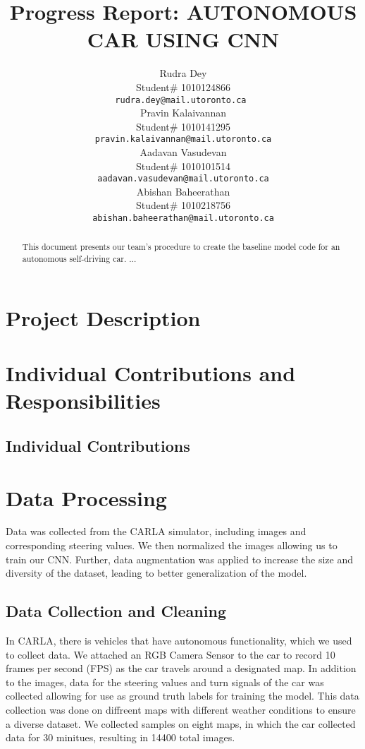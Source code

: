 \documentclass{article} %
\title{Progress Report: AUTONOMOUS CAR USING CNN\\}
\author{Rudra Dey  \\
Student\# 1010124866\\
\texttt{rudra.dey@mail.utoronto.ca } \\
\And
Pravin Kalaivannan  \\
Student\# 1010141295 \\
\texttt{pravin.kalaivannan@mail.utoronto.ca} \\
\AND
Aadavan Vasudevan  \\
Student\# 1010101514 \\
\texttt{aadavan.vasudevan@mail.utoronto.ca} \\
\And
Abishan Baheerathan \\
Student\# 1010218756 \\
\texttt{abishan.baheerathan@mail.utoronto.ca} \\
\AND
}
\begin{document}
\maketitle

\begin{abstract}
This document presents our team's procedure to create the baseline model
code for an autonomous self-driving car. ...\\

\end{abstract}

\section{Project Description}

\section{Individual Contributions and Responsibilities}

\subsection{Individual Contributions}

\section{Data Processing}

Data was collected from the CARLA simulator, including images and corresponding steering values. We then normalized the images allowing us to train our CNN.
Further, data augmentation was applied to increase the size and diversity of the dataset, leading to better generalization of the model.


\subsection{Data Collection and Cleaning}

In CARLA, there is vehicles that have autonomous functionality, which we used to collect data.
We attached an RGB Camera Sensor to the car to record 10 frames per second (FPS) as the car
travels around a designated map. In addition to the images, data for the steering values and turn signals of the car
was collected allowing for use as ground truth labels for training the model. This data collection was done on diffreent maps with different weather conditions
to ensure a diverse dataset. We collected samples on eight maps, in which the car collected data for 30 minitues, resulting in 14400 total images.
\end{document}
